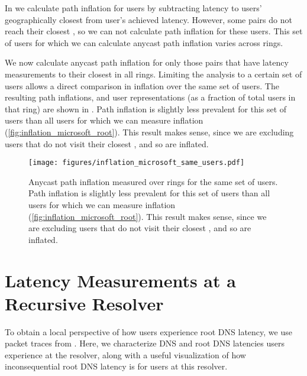 \documentclass[sigconf,letterpaper,nonacm,10pt,anonymous]{acmart}
\begin{document}
In  we calculate path inflation for
users by subtracting latency to users' geographically closest
\feplural from user's achieved latency. However, some \metroas pairs do
not reach their closest \fe, so we can not calculate path inflation for
these users. This set of users for which we can calculate anycast path
inflation varies across rings.

We now calculate anycast path inflation for only those \metroas pairs
that have latency measurements to their closest \fe in all rings.
Limiting the analysis to a certain set of users allows a direct
comparison in inflation over the same set of users. The resulting path
inflations, and user representations (as a fraction of total users in
that ring) are shown in . Path
inflation is slightly less prevalent for this set of users than all
users for which we can measure inflation
(\cref{fig:inflation_microsoft_root}). This result makes sense, since we
are excluding users that do not visit their closest \fe, and so are
inflated.

\begin{figure}
    \centering
    \texttt{[image: figures/inflation\_microsoft\_same\_users.pdf]}
    \caption{Anycast path inflation measured over rings for the same set of users. Path inflation is slightly less prevalent for this set of users than all users for which we can measure inflation (\cref{fig:inflation_microsoft_root}). This result makes sense, since we are excluding users that do not visit their closest \fe, and so are inflated.}
    \label{fig:inflation_microsoft_same_users}
\end{figure}

\section{Latency Measurements at a Recursive
Resolver}\label{latency-measurements-at-a-recursive-resolver-1}

\label{ap:latency_measurements_isi}

To obtain a local perspective of how users experience root DNS latency,
we use packet traces from \ISIone. Here, we characterize DNS and root
DNS latencies users experience at the resolver, along with a useful
visualization of how inconsequential root DNS latency is for users at
this resolver.
\end{document}

